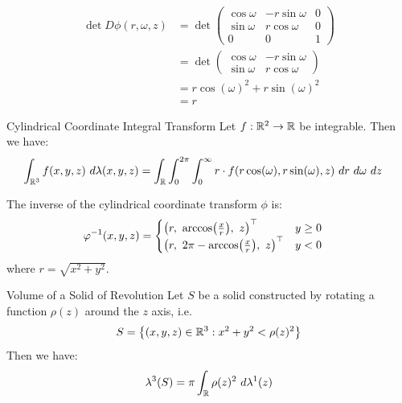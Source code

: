 \begin{align*}
	\det D\phi(r,\omega,z)
	&=
	\det 
	\begin{pmatrix}
		\cos \omega & -r \sin \omega & 0\\
		\sin \omega & r \cos \omega & 0\\
		0 & 0 & 1
	\end{pmatrix}
	\\
	&=
	\det 
	\begin{pmatrix}
		\cos \omega & -r \sin \omega\\
		\sin \omega & r \cos \omega
	\end{pmatrix}
	\\
	&=
	r\cos(\omega)^2 + r\sin(\omega)^2 
	\\
	&= r
\end{align*}
\begin{importantcorollary}{Cylindrical Coordinate Integral Transform}{}
	Let $f : \mathbb{R}^2 \to \mathbb{R}$ be integrable. Then we have:
	\begin{align*}
		\int_{\mathbb{R}^3} f(x,y,z) ~d\lambda(x,y,z) 
		&=
		\int_{\mathbb{R} }\int_{0}^{2\pi} \int_{0}^\infty r \cdot f(r \cos(\omega), r\sin(\omega), z) ~dr ~d\omega ~dz
	\end{align*}
\end{importantcorollary}
\begin{proposition}
	The inverse of the cylindrical coordinate transform $\phi$ is:
	\begin{align*}
		\varphi^{-1}(x,y,z) 
		&=
		\begin{cases}
			\qty(r, ~\arccos(\frac{x}{r}), ~z)^\top & y \geq 0\\
			\qty(r, ~2\pi - \arccos(\frac{x}{r}), ~z)^\top & y < 0
		\end{cases}
	\end{align*}
	where $r = \sqrt{x^2 + y^2}$.
\end{proposition}
\begin{importanttheorem}{Volume of a Solid of Revolution}{}
	Let $S$ be a solid constructed by rotating a function $\rho(z)$ around the $z$ axis, i.e.
	\begin{align*}
		S = \qty{(x,y,z) \in \mathbb{R}^3 : x^2 + y^2 < \rho(z)^2}
	\end{align*}
	Then we have:
	\begin{align*}
		\lambda^3(S) = \pi \int_{\mathbb{R}} \rho(z)^2 ~d\lambda^1(z)
	\end{align*}
\end{importanttheorem}
